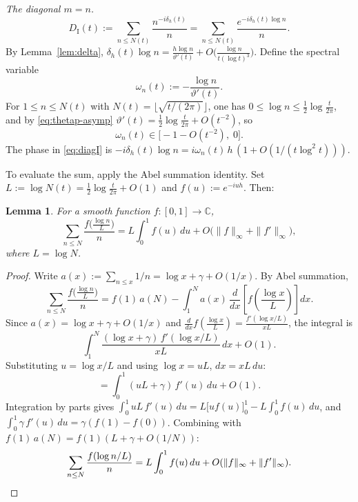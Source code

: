 \documentclass[11pt]{article}
\theoremstyle{plain}
\newtheorem{lemma}[theorem]{Lemma}
\theoremstyle{definition}
\newcommand{\assign}{:=}
\newcommand{\CC}{\mathbb{C}}
\begin{document}
\medskip\noindent
\textit{The diagonal $m=n$.}\enspace
\begin{equation}\label{eq:diagI}
D_{\mathrm{I}}(t)
\assign
\sum_{n\le N(t)} \frac{n^{-i\delta_h(t)}}{n}
= \sum_{n\le N(t)} \frac{e^{-i\delta_h(t)\log n}}{n}.
\end{equation}
By Lemma~\ref{lem:delta},
$\delta_h(t)\log n = \frac{h\log n}{\vartheta'(t)}
+ O\bigl(\frac{\log n}{t(\log t)^3}\bigr)$.
Define the spectral variable
\begin{equation}\label{eq:omega-def}
\omega_n(t) \assign -\frac{\log n}{\vartheta'(t)}.
\end{equation}
For $1\le n\le N(t)$ with $N(t)=\lfloor\sqrt{t/(2\pi)}\rfloor$,
one has $0\le \log n \le \frac{1}{2}\log\frac{t}{2\pi}$,
and by \eqref{eq:thetap-asymp}
$\vartheta'(t) = \frac{1}{2}\log\frac{t}{2\pi} + O(t^{-2})$,
so
\begin{equation}\label{eq:omega-range}
\omega_n(t) \in \bigl[-1-O(t^{-2}),\;0\bigr].
\end{equation}
The phase in \eqref{eq:diagI} is
$-i\delta_h(t)\log n = i\omega_n(t)\,h\,(1+O(1/(t\log^2 t)))$.

To evaluate the sum, apply the Abel summation identity.
Set $L\assign\log N(t) = \frac{1}{2}\log\frac{t}{2\pi}+O(1)$
and $f(u)\assign e^{-iuh}$.
Then:

\begin{lemma}\label{lem:partial-sum}
For a smooth function $f:[0,1]\to\CC$,
\[
\sum_{n\le N}\frac{f\bigl(\frac{\log n}{L}\bigr)}{n}
= L\int_0^1 f(u)\,du + O\!\bigl(\|f\|_\infty + \|f'\|_\infty\bigr),
\]
where $L=\log N$.
\end{lemma}

\begin{proof}
Write $a(x)\assign\sum_{n\le x}1/n = \log x + \gamma + O(1/x)$.
By Abel summation,
\[
\sum_{n\le N}\frac{f\bigl(\frac{\log n}{L}\bigr)}{n}
= f(1)\,a(N) - \int_1^N a(x)\,\frac{d}{dx}\!
  \left[f\!\left(\frac{\log x}{L}\right)\right]dx.
\]
Since $a(x) = \log x + \gamma + O(1/x)$ and
$\frac{d}{dx}f(\frac{\log x}{L}) = \frac{f'(\log x/L)}{xL}$,
the integral is
\[
\int_1^N \frac{(\log x+\gamma)\,f'(\log x/L)}{xL}\,dx + O(1).
\]
Substituting $u=\log x/L$ and using
$\log x = uL$, $dx = xL\,du$:
\[
= \int_0^1 (uL+\gamma)\,f'(u)\,du + O(1).
\]
Integration by parts gives
$\int_0^1 uL\,f'(u)\,du = L\bigl[uf(u)\bigr]_0^1 - L\int_0^1 f(u)\,du$,
and $\int_0^1\gamma\,f'(u)\,du = \gamma(f(1)-f(0))$.
Combining with $f(1)\,a(N) = f(1)(L+\gamma+O(1/N))$:
\[
\sum_{n\le N}\frac{f(\log n/L)}{n}
= L\int_0^1 f(u)\,du + O(\|f\|_\infty + \|f'\|_\infty).
\qedhere
\]
\end{proof}
\end{document}
